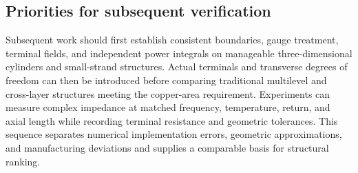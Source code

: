 \hypertarget{04.recommendations.heading}{}
\subsection{Priorities for subsequent verification}

\hypertarget{04.recommendations.p1}{}
Subsequent work should first establish consistent boundaries, gauge treatment, terminal fields, and independent power integrals on manageable three-dimensional cylinders and small-strand structures. Actual terminals and transverse degrees of freedom can then be introduced before comparing traditional multilevel and cross-layer structures meeting the copper-area requirement. Experiments can measure complex impedance at matched frequency, temperature, return, and axial length while recording terminal resistance and geometric tolerances. This sequence separates numerical implementation errors, geometric approximations, and manufacturing deviations and supplies a comparable basis for structural ranking.
